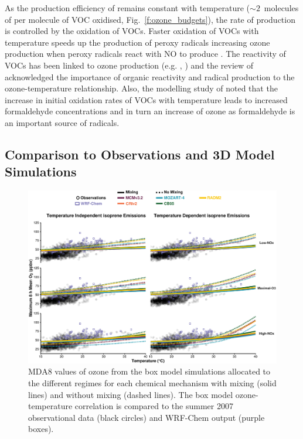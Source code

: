 As the production efficiency of  remains constant with temperature ($\sim2$~molecules of  per molecule of VOC oxidised, Fig.~\ref{f:ozone_budgets}), the rate of  production is controlled by the oxidation of VOCs.
Faster oxidation of VOCs with temperature speeds up the production of peroxy radicals increasing ozone production when peroxy radicals react with NO to produce .
The reactivity of VOCs has been linked to ozone production (e.g. \citet{Kleinman:2005}, \citet{Sadanaga:2005}) and the review of \citet{Pusede:2015} acknowledged the importance of organic reactivity and radical production to the ozone-temperature relationship.
Also, the modelling study of \citet{Steiner:2006} noted that the increase in initial oxidation rates of VOCs with temperature leads to increased formaldehyde concentrations and in turn an increase of ozone as formaldehyde is an important source of  radicals.

\subsection{Comparison to Observations and 3D Model Simulations} \label{ss:r_observations}
\begin{figure}[t]%
    \centering%
    \caption{MDA8 values of ozone from the box model simulations allocated to the different  regimes for each chemical mechanism with mixing (solid lines) and without mixing (dashed lines). The box model ozone-temperature correlation is compared to the summer 2007 observational data (black circles) and WRF-Chem output (purple boxes).}%
    \label{f:comparison}%
    \vspace{2mm}%
    \includegraphics[height=0.43\textheight]{img/Germany_O3-T_ERA_WRF_2007}%
\end{figure}

